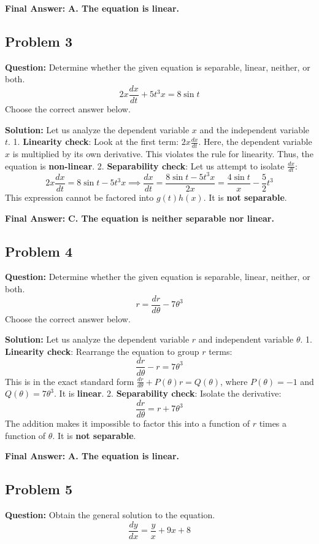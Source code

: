 \documentclass[11pt]{article}
\begin{document}
\textbf{Final Answer:} \textbf{A. The equation is linear.}

\hrulefill

\subsection*{Problem 3}
\textbf{Question:} Determine whether the given equation is separable, linear, neither, or both.
\[ 2x \frac{dx}{dt} + 5t^3 x = 8\sin t \]
Choose the correct answer below.

\textbf{Solution:}
Let us analyze the dependent variable $x$ and the independent variable $t$.
1. \textbf{Linearity check}: Look at the first term: $2x \frac{dx}{dt}$. Here, the dependent variable $x$ is multiplied by its own derivative. This violates the rule for linearity. Thus, the equation is \textbf{non-linear}.
2. \textbf{Separability check}: Let us attempt to isolate $\frac{dx}{dt}$:
\[ 2x \frac{dx}{dt} = 8\sin t - 5t^3 x \implies \frac{dx}{dt} = \frac{8\sin t - 5t^3 x}{2x} = \frac{4\sin t}{x} - \frac{5}{2}t^3 \]
This expression cannot be factored into $g(t)h(x)$. It is \textbf{not separable}.

\textbf{Final Answer:} \textbf{C. The equation is neither separable nor linear.}

\hrulefill

\subsection*{Problem 4}
\textbf{Question:} Determine whether the given equation is separable, linear, neither, or both.
\[ r = \frac{dr}{d\theta} - 7\theta^3 \]
Choose the correct answer below.

\textbf{Solution:}
Let us analyze the dependent variable $r$ and independent variable $\theta$.
1. \textbf{Linearity check}: Rearrange the equation to group $r$ terms:
\[ \frac{dr}{d\theta} - r = 7\theta^3 \]
This is in the exact standard form $\frac{dr}{d\theta} + P(\theta)r = Q(\theta)$, where $P(\theta) = -1$ and $Q(\theta) = 7\theta^3$. It is \textbf{linear}.
2. \textbf{Separability check}: Isolate the derivative:
\[ \frac{dr}{d\theta} = r + 7\theta^3 \]
The addition makes it impossible to factor this into a function of $r$ times a function of $\theta$. It is \textbf{not separable}.

\textbf{Final Answer:} \textbf{A. The equation is linear.}

\hrulefill

\subsection*{Problem 5}
\textbf{Question:} Obtain the general solution to the equation.
\[ \frac{dy}{dx} = \frac{y}{x} + 9x + 8 \]
\end{document}
